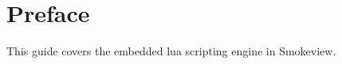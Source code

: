 \documentclass[11pt,twoside]{book}
\begin{document}
\date{}

\setlength{\parindent}{0.25in}

\newpage

\begin{minipage}[t][9in][s]{6.5in}


\begin{flushright}
\end{flushright}

\vspace{3in}


\vspace{3in}

\large
\begin{flushright}
\end{flushright}

\vfill

\end{minipage}


\frontmatter

\pagestyle{plain}


\chapter{Preface}
\smvoverview
This guide covers the embedded lua scripting engine in Smokeview.

\end{document}
